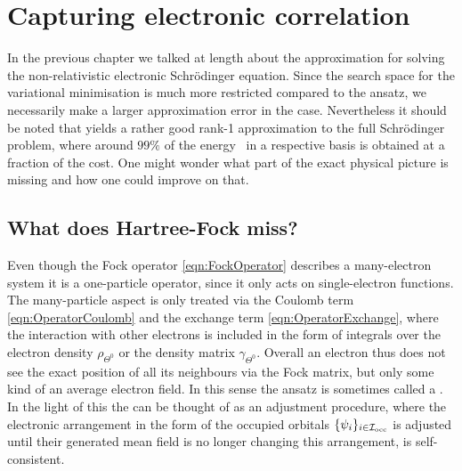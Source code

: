 \section{Capturing electronic correlation}
\label{sec:Correlation}

In the previous chapter we talked at length about the \HF approximation for solving
the non-relativistic electronic Schrödinger equation.
Since the search space for the variational minimisation is much more restricted compared
to the \FCI ansatz,
we necessarily make a larger approximation error in the \HF case.
Nevertheless it should be noted that \HF yields a rather good rank-1
approximation to the full Schrödinger problem,
where around $99\%$ of the \FCI energy~\cite{Jensen2007book} in a respective basis is obtained
at a fraction of the cost.
One might wonder
what part of the exact physical picture \HF is missing and how one could improve on that.

\subsection{What does Hartree-Fock miss?}
\label{sec:FailureHF}
Even though the
Fock operator \eqref{eqn:FockOperator} describes a many-electron system
it is a one-particle operator,
since it only acts on single-electron functions.
The many-particle aspect is only treated via the Coulomb term \eqref{eqn:OperatorCoulomb}
and the exchange term \eqref{eqn:OperatorExchange},
where the interaction with
other electrons is included in the form of integrals over
the electron density $\rho_{\Theta^0}$ or the density matrix $\gamma_{\Theta^0}$.
Overall an electron thus does not see the exact position of all its neighbours
via the Fock matrix,
but only some kind of an average electron field.
In this sense the \HF ansatz is sometimes called a .
In the light of this the \SCF can be thought of as an adjustment procedure,
where the electronic arrangement in the form of the occupied \SCF orbitals $\{\psi_i\}_{i\in\mathcal{I}_\text{occ}}$
is adjusted until their generated mean field
is no longer changing this arrangement,
\ie is self-consistent.

